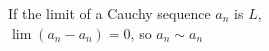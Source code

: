 \documentclass[preview]{standalone}
\begin{document}
\begin{center}
If the limit of a Cauchy sequence $a_n$ is $L$, \\$\lim (a_n - a_n) = 0$, so $a_n \sim a_n$
\end{center}
\end{document}

